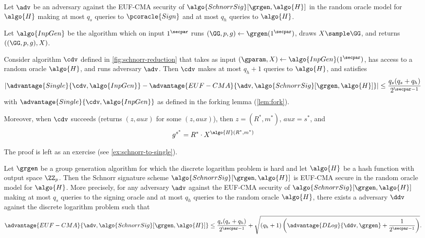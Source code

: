 \begin{lemma}\label{lem:schnorr-to-single}
  Let $\adv$ be an adversary against the EUF-CMA security of $\algo{SchnorrSig}[\grgen, \algo{H}]$ in the random oracle model for $\algo{H}$ making at most $q_s$ queries to $\pcoracle{Sign}$ and at most $q_h$ queries to $\algo{H}$.

  Let $\algo{InpGen}$ be the algorithm which on input $1^\secpar$ runs $(\GG, p, g) \gets \grgen(1^\secpar)$, draws $X \sample \GG$, and returns $((\GG, p, g), X)$.

  Consider algorithm $\cdv$ defined in \autoref{fig:schnorr-reduction} that takes as input $(\gparam, X) \gets \algo{InpGen}(1^\secpar)$, has access to a random oracle $\algo{H}$, and runs adversary $\adv$. Then $\cdv$ makes at most $q_h + 1$ queries to $\algo{H}$, and satisfies
  \[
    \left|\advantage{Single}{\cdv, \algo{InpGen}} - \advantage{EUF-CMA}{\adv, \algo{SchnorrSig}[\grgen, \algo{H}]}\right| \leq \frac{q_s(q_s + q_h)}{2^{\secpar-1}}
  \]
  with $\advantage{Single}{\cdv, \algo{InpGen}}$ as defined in the forking lemma (\autoref{lem:fork}).

  Moreover, when $\cdv$ succeeds (returns $(z, \mathit{aux})$ for some $(z, \mathit{aux})$), then $z = (R^*, m^*)$, $\mathit{aux} = s^*$, and
  \[
    g^{s^*} = R^* \cdot X^{\algo{H}(R^*, m^*)}
  \]
\end{lemma}

The proof is left as an exercise (see \autoref{ex:schnorr-to-single}).

\begin{theorem}\label{thm:schnorr-euf-cma}
  Let $\grgen$ be a group generation algorithm for which the discrete logarithm problem is hard and let $\algo{H}$ be a hash function with output space $\ZZ_p$.
  Then the Schnorr signature scheme $\algo{SchnorrSig}[\grgen, \algo{H}]$ is EUF-CMA secure in the random oracle model for $\algo{H}$.
  More precisely, for any \ppt adversary $\adv$ against the EUF-CMA security of $\algo{SchnorrSig}[\grgen, \algo{H}]$ making at most $q_s$ queries to the signing oracle and at most $q_h$ queries to the random oracle $\algo{H}$,
  there exists a \ppt adversary $\ddv$ against the discrete logarithm problem such that
  \[
    \advantage{EUF-CMA}{\adv, \algo{SchnorrSig}[\grgen, \algo{H}]} \leq \frac{q_s(q_s + q_h)}{2^{\secpar-1}} + \sqrt{(q_h + 1) \left(\advantage{DLog}{\ddv, \grgen} + \frac{1}{2^{\secpar-1}}\right)}.
  \]
\end{theorem}

